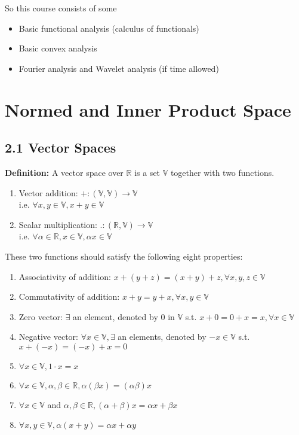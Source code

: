 \documentclass{article}
\begin{document}
So this course consists of some
\begin{itemize}
        \item Basic functional analysis (calculus of functionals)
        \item Basic convex analysis 
        \item Fourier analysis and Wavelet analysis (if time allowed)
\end{itemize}

\pagebreak

\section*{Normed and Inner Product Space}
\subsection*{2.1 Vector Spaces}
    \textbf{Definition:} A vector space over $\mathbb{R}$ is a set $\mathbb{V}$ together with two functions. 
    \begin{enumerate}
        \item Vector addition: $+ : (\mathbb{V},\mathbb{V}) \to \mathbb{V}$ \\i.e. $\forall x, y \in \mathbb{V}, x + y \in \mathbb{V}$
        \item Scalar multiplication: $. : (\mathbb{R},\mathbb{V}) \to \mathbb{V}$ 
        \\i.e. $\forall \alpha \in  \mathbb{R}, x \in \mathbb{V}, \alpha x \in \mathbb{V}$ 
    \end{enumerate}
    
These two functions should satisfy the following eight properties:
\begin{enumerate}
    \item Associativity of addition: $ x + (y + z) = (x + y) + z, \forall x, y, z \in \mathbb{V}$
    \item Commutativity of addition: $ x + y = y + x,  \forall x, y \in \mathbb{V}$
    \item Zero vector: $\exists$ an element, denoted by 0 in $\mathbb{V}$ s.t.  $x + 0 = 0 + x = x, \forall x \in \mathbb{V}$
    \item Negative vector: $\forall x \in \mathbb{V}, \exists$ an elements, denoted by $-x \in \mathbb{V}$ s.t. $x + (-x) = (-x) + x = 0 $
    \item $\forall x \in \mathbb{V}, 1\cdot x = x$
    \item $\forall x \in \mathbb{V}, \alpha, \beta \in \mathbb{R}, \alpha(\beta x) = (\alpha \beta)x$
    \item $\forall x \in \mathbb{V}$ and $\alpha,\beta \in \mathbb{R}, (\alpha + \beta)x = \alpha x + \beta x$
    \item $\forall x, y \in \mathbb{V}, \alpha(x + y) = \alpha x + \alpha y$
    
\end{enumerate} 
    
\end{document}
